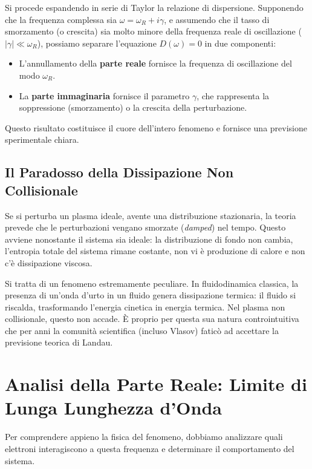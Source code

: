 Si procede espandendo in serie di Taylor la relazione di dispersione. Supponendo che la frequenza complessa sia $\omega = \omega_R + i\gamma$, e assumendo che il tasso di smorzamento (o crescita) sia molto minore della frequenza reale di oscillazione ($\vert{}\gamma\vert{} \ll \omega_R$), possiamo separare l'equazione $D(\omega) = 0$ in due componenti:
\begin{itemize}
\item L'annullamento della \textbf{parte reale} fornisce la frequenza di oscillazione del modo $\omega_R$.
\item La \textbf{parte immaginaria} fornisce il parametro $\gamma$, che rappresenta la soppressione (smorzamento) o la crescita della perturbazione.
\end{itemize}

Questo risultato costituisce il cuore dell'intero fenomeno e fornisce una previsione sperimentale chiara.

\subsection{Il Paradosso della Dissipazione Non Collisionale}
Se si perturba un plasma ideale, avente una distribuzione stazionaria, la teoria prevede che le perturbazioni vengano smorzate (\textit{damped}) nel tempo. Questo avviene nonostante il sistema sia ideale: la distribuzione di fondo non cambia, l'entropia totale del sistema rimane costante, non vi è produzione di calore e non c'è dissipazione viscosa.

Si tratta di un fenomeno estremamente peculiare. In fluidodinamica classica, la presenza di un'onda d'urto in un fluido genera dissipazione termica: il fluido si riscalda, trasformando l'energia cinetica in energia termica. Nel plasma non collisionale, questo non accade. È proprio per questa sua natura controintuitiva che per anni la comunità scientifica (incluso Vlasov) faticò ad accettare la previsione teorica di Landau.

\section{Analisi della Parte Reale: Limite di Lunga Lunghezza d'Onda}

Per comprendere appieno la fisica del fenomeno, dobbiamo analizzare quali elettroni interagiscono a questa frequenza e determinare il comportamento del sistema.

